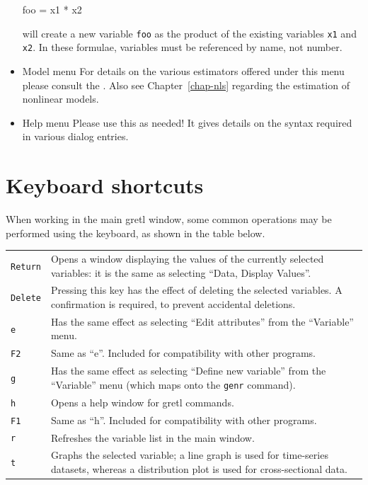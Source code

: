 \begin{itemize}
\begin{code} 
foo = x1 * x2
\end{code}

  will create a new variable \verb+foo+ as the product of the existing
  variables \verb+x1+ and \verb+x2+.  In these formulae, variables
  must be referenced by name, not number.

\item \textsf{Model menu} For details on the various estimators
  offered under this menu please consult the \GCR.  Also see
  Chapter~\ref{chap-nls} regarding the estimation of nonlinear models.

\item \textsf{Help menu} Please use this as needed! It gives details
  on the syntax required in various dialog entries.
\end{itemize}


\section{Keyboard shortcuts}
\label{keyb-accel}

When working in the main gretl window, some common operations
may be performed using the keyboard, as shown in the table below.

\begin{center}
\begin{tabular}{lp{5in}}
  \texttt{Return} & Opens a window displaying the values of the currently
  selected variables: it is the same as selecting ``Data, Display
  Values''. \\
  \texttt{Delete} & Pressing this key has the effect of deleting the
  selected variables. A confirmation is required, to prevent
  accidental deletions. \\
  \texttt{e} & Has the same effect as selecting ``Edit
  attributes'' from the ``Variable'' menu. \\
  \texttt{F2} & Same as ``e''. Included for compatibility with other
  programs.\\
  \texttt{g} & Has the same effect as selecting ``Define new
  variable'' from the ``Variable'' menu (which maps onto the
  \texttt{genr} command).\\
  \texttt{h} & Opens a help window for gretl commands.\\
  \texttt{F1} & Same as ``h''. Included for compatibility with other
  programs.\\
  \texttt{r} & Refreshes the variable list in the main window. \\
  \texttt{t} & Graphs the selected variable; a line graph is used for
  time-series datasets, whereas a distribution plot is used for
  cross-sectional data. 
\end{tabular}
\end{center}


